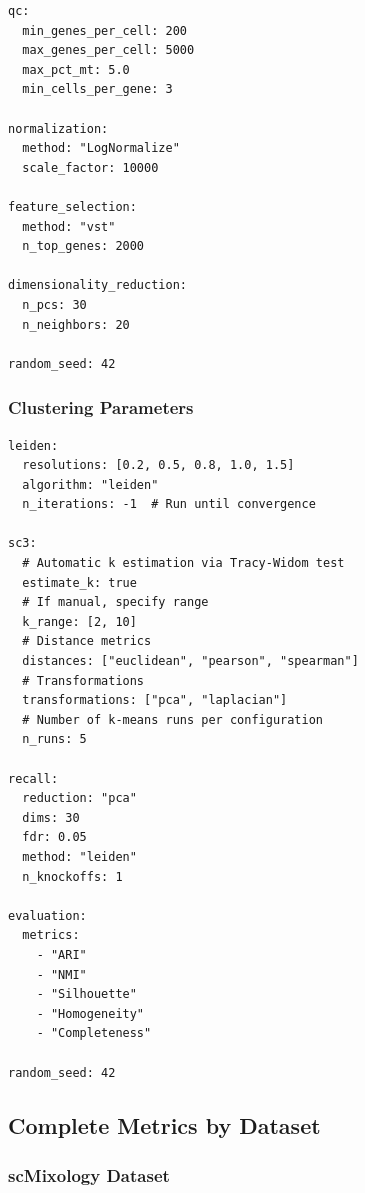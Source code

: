 \begin{lstlisting}[caption={preprocessing\_params.yaml}]
qc:
  min_genes_per_cell: 200
  max_genes_per_cell: 5000
  max_pct_mt: 5.0
  min_cells_per_gene: 3

normalization:
  method: "LogNormalize"
  scale_factor: 10000

feature_selection:
  method: "vst"
  n_top_genes: 2000

dimensionality_reduction:
  n_pcs: 30
  n_neighbors: 20

random_seed: 42
\end{lstlisting}

\subsubsection{Clustering Parameters}

\begin{lstlisting}[caption={clustering\_params.yaml}]
leiden:
  resolutions: [0.2, 0.5, 0.8, 1.0, 1.5]
  algorithm: "leiden"
  n_iterations: -1  # Run until convergence

sc3:
  # Automatic k estimation via Tracy-Widom test
  estimate_k: true
  # If manual, specify range
  k_range: [2, 10]
  # Distance metrics
  distances: ["euclidean", "pearson", "spearman"]
  # Transformations
  transformations: ["pca", "laplacian"]
  # Number of k-means runs per configuration
  n_runs: 5

recall:
  reduction: "pca"
  dims: 30
  fdr: 0.05
  method: "leiden"
  n_knockoffs: 1

evaluation:
  metrics:
    - "ARI"
    - "NMI"
    - "Silhouette"
    - "Homogeneity"
    - "Completeness"

random_seed: 42
\end{lstlisting}

\subsection{Complete Metrics by Dataset}

\subsubsection{scMixology Dataset}

